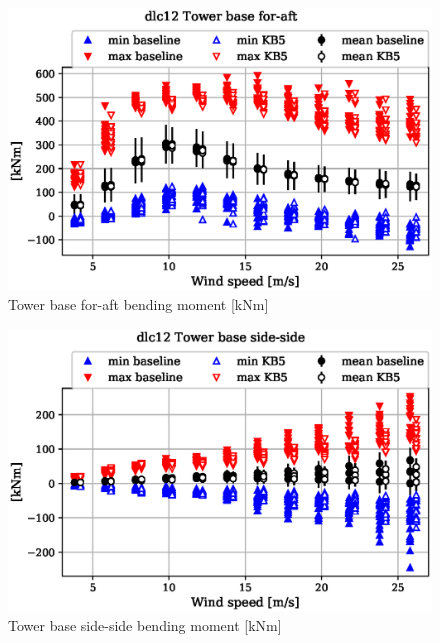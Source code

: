 \begin{figure}[!ht]
\begin{center}
	\includegraphics[width=.85\linewidth]{figures/baseline-vs-KB6/dlc12/tower-tower-node-001-momentvec-x_AA0008_AA0008.eps}
\end{center}
\caption{Tower base for-aft bending moment [kNm]}
\label{fig:baseline-vs-KB6:dlc12:tower-base-fa}
\end{figure}

\begin{figure}[!ht]
\begin{center}
	\includegraphics[width=.85\linewidth]{figures/baseline-vs-KB6/dlc12/tower-tower-node-001-momentvec-y_AA0008_AA0008.eps}
\end{center}
\caption{Tower base side-side bending moment [kNm]}
\label{fig:baseline-vs-KB6:dlc12:tower-base-ss}
\end{figure}

